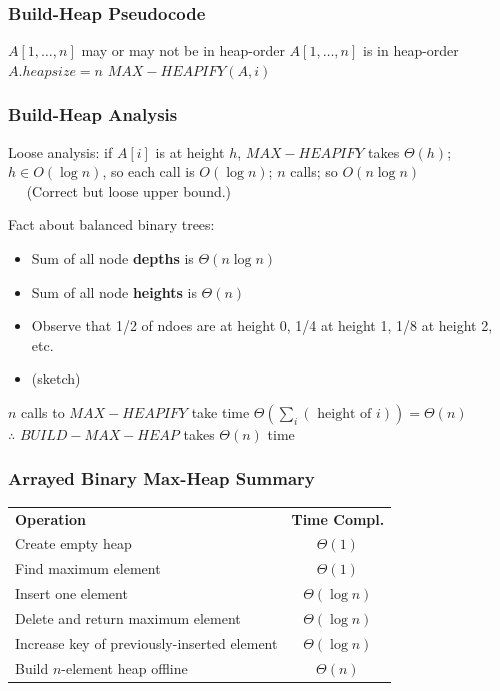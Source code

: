 \documentclass{beamer}
\newcommand{\stanza}{ \\~\ }
\begin{document}
\begin{frame} \frametitle{Build-Heap Pseudocode}
  \begin{algorithmic}[1]
    \Require $A[1, \ldots, n]$ may or may not be in heap-order
    \Ensure $A[1, \ldots, n]$ is in heap-order
    \State $A.heapsize = n$
      \State $MAX-HEAPIFY(A, i)$
    \EndFor
    \EndFunction
  \end{algorithmic}
\end{frame}

\begin{frame} \frametitle{Build-Heap Analysis}
Loose analysis: if $A[i]$ is at height $h$, $MAX-HEAPIFY$ takes $\Theta(h)$;
  $h \in O(\log n)$, so each call is $O(\log n)$; $n$ calls; so $O(n \log n)$ \stanza
(Correct but loose upper bound.)

Fact about balanced binary trees:
\begin{itemize}
  \item Sum of all node \textbf{depths} is $\Theta(n \log n)$
  \item Sum of all node \textbf{heights} is $\Theta(n)$
  \item Observe that 1/2 of ndoes are at height 0, 1/4 at height 1, 1/8 at height 2, etc.
  \item (sketch)
\end{itemize}

$n$ calls to $MAX-HEAPIFY$ take time $\Theta(\sum_i (\text{ height of } i)) = \Theta(n)$ \\
$\therefore$ $BUILD-MAX-HEAP$ takes $\Theta(n)$ time
\end{frame}

\begin{frame} \frametitle{Arrayed Binary Max-Heap Summary}

\begin{center}
  \begin{tabular}{lc}
    \textbf{Operation} & \textbf{Time Compl.} \\
    Create empty heap & $\Theta(1)$ \\
    Find maximum element & $\Theta(1)$ \\
    Insert one element & $\Theta(\log n)$ \\
    Delete and return maximum element & $\Theta(\log n)$ \\
    Increase key of previously-inserted element & $\Theta(\log n)$ \\
    Build $n$-element heap offline & $\Theta(n)$ \\
  \end{tabular}
\end{center}

\end{frame}
\end{document}
